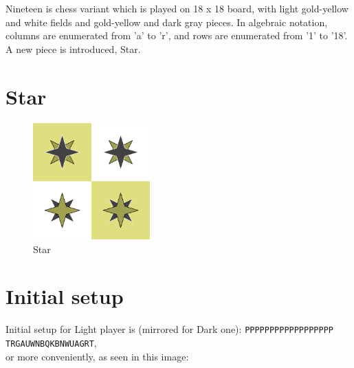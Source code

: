 \documentclass[a5paper,12pt,draft]{book} %
\begin{document}
\noindent
Nineteen is chess variant which is played on 18 x 18 board, with
light gold-yellow and white fields and gold-yellow and dark gray
pieces. In algebraic notation, columns are enumerated from 'a' to 'r',
and rows are enumerated from '1' to '18'. A new piece is introduced,
Star.

\clearpage

\section*{Star}

\noindent
\begin{figure}
\includegraphics[width=0.4\textwidth, keepaspectratio=true]{../gfx/pieces/11_star.png}
\caption{Star}
\label{fig:star}
\end{figure}

\clearpage

\section*{Initial setup}

Initial setup for Light player is (mirrored for Dark one):
\texttt{PPPPPPPPPPPPPPPPPP \\
        TRGAUWNBQKBNWUAGRT}, \\
or more conveniently, as seen in this image:
\end{document}
